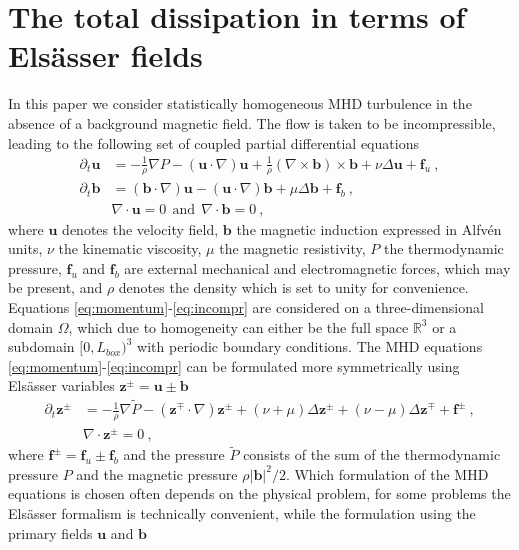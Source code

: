 \documentclass[aps,pre,onecolumn,superscriptaddress,notitlepage]{revtex4-1}
\renewcommand{\vec}[1]{\bm{#1}}
\newcommand{\vu}{\vec{u}}
\newcommand{\vb}{\vec{b}}
\newcommand{\zpm}{\vec{z}^\pm}
\newcommand{\zmp}{\vec{z}^\mp}
\begin{document}
\section{The total dissipation in terms of Els\"asser fields}
\label{sec:definitions}
In this paper we consider statistically homogeneous MHD turbulence in the absence 
of a background magnetic field. The flow is taken to be incompressible, leading to the following
set of coupled partial differential equations
\begin{align}
\label{eq:momentum}
\partial_t \vec{u}&= - \frac{1}{\rho}\nabla P -(\vec{u}\cdot \nabla)\vec{u}
 + \frac{1}{\rho}(\nabla \times \vec{b}) \times \vec{b} + \nu \Delta \vec{u} +  \vec{f}_u  \ , \\
\label{eq:induction}
\partial_t \vec{b}&= (\vec{b}\cdot \nabla)\vec{u}-(\vec{u}\cdot \nabla)\vec{b} + \mu \Delta \vec{b} + \vec{f}_b\ , \\
\label{eq:incompr}
&\nabla \cdot \vec{u} = 0 \ \ \mbox{and} \ \  \nabla \cdot \vec{b} = 0 \ ,  
\end{align}
where $\vec{u}$ denotes the velocity field, $\vec{b}$ the magnetic
induction expressed in Alfv\'{e}n units, 
$\nu$ the kinematic viscosity, $\mu$ the
magnetic resistivity, $P$ the thermodynamic pressure, $\vec{f}_u$ and $\vec{f}_b$ are
external mechanical and electromagnetic forces, which may be present,
and $\rho$ denotes the density which is set to unity for convenience.
Equations \eqref{eq:momentum}-\eqref{eq:incompr} are considered on a three-dimensional
domain $\Omega$, which due to homogeneity can either be the full space $\mathbb{R}^3$ 
or a subdomain $[0,L_{box})^3$ with periodic boundary conditions.
The MHD equations \eqref{eq:momentum}-\eqref{eq:incompr} 
can be formulated more symmetrically using Els\"asser variables
$\vec{z^\pm}=\vec{u} \pm \vec{b}$ \cite{Elsasser50}
\begin{align}
\partial_t \zpm&= - \frac{1}{\rho}\nabla \tilde{P} -(\zmp\cdot \nabla)\zpm 
+ (\nu + \mu) \Delta \zpm + (\nu - \mu) \Delta \zmp + \vec{f}^\pm  \ , \\
&\nabla \cdot \zpm = 0 \ ,  
\label{eq:elsasser}
\end{align}
where $\vec{f}^\pm = \vec{f}_u \pm \vec{f}_b$ and
the pressure $\tilde{P}$ consists of the sum of the thermodynamic pressure $P$ and the
magnetic pressure $\rho|\vb|^2/2$. Which formulation of the MHD equations is chosen
often depends on the physical problem, for some problems the Els\"asser formalism
is technically convenient, while the formulation using the primary fields $\vu$ and $\vb$
\end{document}
